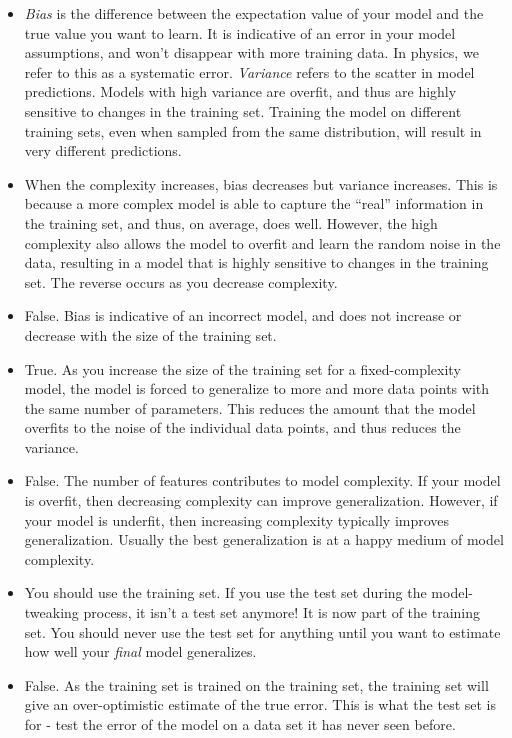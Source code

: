 \documentclass{article}
\begin{document}
\begin{itemize}
        \item 
        \textit{Bias} is the difference between the expectation value of your model and the true value you want to learn. 
        It is indicative of an error in your model assumptions, and won't disappear with more training data. 
        In physics, we refer to this as a systematic error.
        \textit{Variance} refers to the scatter in model predictions. 
        Models with high variance are overfit, and thus are highly sensitive to changes in the training set. 
        Training the model on different training sets, even when sampled from the same distribution, will result in very different predictions.

        \item
        When the complexity increases, bias decreases but variance increases.
        This is because a more complex model is able to capture the ``real'' information in the training set, and thus, on average, does well.
        However, the high complexity also allows the model to overfit and learn the random noise in the data, resulting in a model that is highly sensitive to changes in the training set.
        The reverse occurs as you decrease complexity.

        \item
        False.
        Bias is indicative of an incorrect model, and does not increase or decrease with the size of the training set.

        \item
        True.
        As you increase the size of the training set for a fixed-complexity model, the model is forced to generalize to more and more data points with the same number of parameters.
        This reduces the amount that the model overfits to the noise of the individual data points, and thus reduces the variance.

        \item 
        False.
        The number of features contributes to model complexity.
        If your model is overfit, then decreasing complexity can improve generalization.
        However, if your model is underfit, then increasing complexity typically improves generalization.
        Usually the best generalization is at a happy medium of model complexity.

        \item
        You should use the training set.
        If you use the test set during the model-tweaking process, it isn't a test set anymore!
        It is now part of the training set.
        You should never use the test set for anything until you want to estimate how well your \textit{final} model generalizes.

        \item
        False.
        As the training set is trained on the training set, the training set will give an over-optimistic estimate of the true error.
        This is what the test set is for - test the error of the model on a data set it has never seen before.
\end{itemize}
\end{document}

